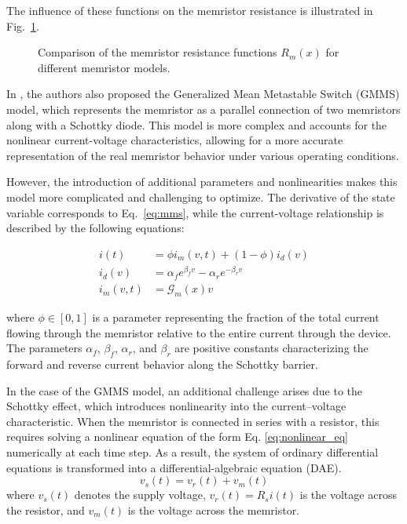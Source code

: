 \documentclass[11pt, oneside]{article}
\newcommand{\G}{\mathcal{G}}
\begin{document}
The influence of these functions on the memristor resistance is illustrated in Fig.~\ref{fig:m-x}.

\begin{figure}[H]
    \centering
    \resizebox{0.5\linewidth}{!}{%
        
    }
    \caption{Comparison of the memristor resistance functions $R_m(x)$ for different memristor models.}
    \label{fig:m-x}
\end{figure}

In \cite{Molter2016}, the authors also proposed the Generalized Mean Metastable Switch (GMMS) model, which represents the memristor as a parallel connection of two memristors along with a Schottky diode. This model is more complex and accounts for the nonlinear current-voltage characteristics, allowing for a more accurate representation of the real memristor behavior under various operating conditions.

However, the introduction of additional parameters and nonlinearities makes this model more complicated and challenging to optimize. The derivative of the state variable corresponds to Eq.~\eqref{eq:mms}, while the current-voltage relationship is described by the following equations:

\begin{align}
    i(t)      & = \phi i_m(v, t) + (1-\phi) i_d(v)                 \\
    i_d(v)    & = \alpha_f e^{\beta_f v} - \alpha_r e^{-\beta_r v} \\
    i_m(v, t) & = \G_m(x) v
\end{align}

where $\phi \in [0,1]$ is a parameter representing the fraction of the total current flowing through the memristor relative to the entire current through the device. The parameters $\alpha_f$, $\beta_f$, $\alpha_r$, and $\beta_r$ are positive constants characterizing the forward and reverse current behavior along the Schottky barrier.


In the case of the GMMS model, an additional challenge arises due to the Schottky effect, which introduces nonlinearity into the current–voltage characteristic. When the memristor is connected in series with a resistor, this requires solving a nonlinear equation of the form Eq. \eqref{eq:nonlinear_eq} numerically at each time step. As a result, the system of ordinary differential equations is transformed into a differential-algebraic equation (DAE).
\begin{equation}
    v_s(t) = v_r(t) + v_m(t)
    \label{eq:nonlinear_eq}
\end{equation}
where $v_s(t)$ denotes the supply voltage, $v_r(t) = R_s i(t)$ is the voltage across the resistor, and $v_m(t)$ is the voltage across the memristor.
\end{document}

